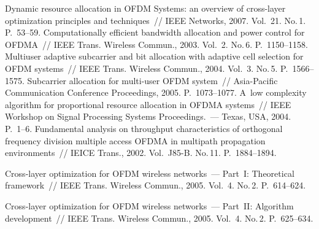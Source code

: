 \begin{multicols}{2}
{{\begin{thebibliography}{99}
 Dynamic resource allocation in OFDM Systems: 
an overview of cross-layer optimization principles and techniques~// IEEE Networks, 2007. 
Vol.~21. No.\,1. P.~53--59.
Computationally efficient bandwidth allocation and power control for OFDMA~// IEEE 
Trans. Wireless Commun., 2003. Vol.~2. No.\,6. P.~1150--1158.
 Multiuser adaptive subcarrier and bit allocation with adaptive 
cell selection for OFDM systems~// IEEE Trans. Wireless Commun., 2004. 
Vol.~3. No.\,5. P.~1566--1575.
Subcarrier allocation for multi-user OFDM system~// Asia-Pacific Communication Conference 
Proceedings, 2005. P.~1073--1077.
 A~low complexity algorithm for proportional 
resource allocation in OFDMA systems~// IEEE Workshop on Signal Processing Systems 
Proceedings.~--- Texas, USA, 2004. P.~1--6.
 Fundamental analysis on throughput characteristics of orthogonal 
frequency division multiple access OFDMA in multipath propagation environments~// IEICE  
Trans., 2002. Vol.~J85-B. No.\,11. P.~1884--1894.

\label{end\stat}
Cross-layer optimization for OFDM wireless networks~--- Part~I: Theoretical framework~// 
IEEE Trans. Wireless Commun., 2005. Vol.~4. No.\,2. P.~614--624.


 Cross-layer optimization for OFDM wireless networks~--- Part~II: 
Algorithm development~// IEEE Trans. Wireless Commun., 2005. Vol.~4. 
No.\,2. P.~625--634.
 \end{thebibliography}
}
}


\end{multicols}